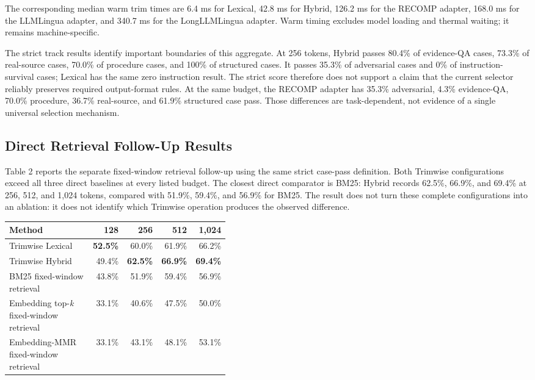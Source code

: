\documentclass[
]{article}
\newcounter{none} %
\begin{document}
The corresponding median warm trim times are 6.4 ms for Lexical, 42.8 ms
for Hybrid, 126.2 ms for the RECOMP adapter, 168.0 ms for the LLMLingua
adapter, and 340.7 ms for the LongLLMLingua adapter. Warm timing excludes
model loading and thermal waiting; it remains machine-specific.

The strict track results identify important boundaries of this
aggregate. At 256 tokens, Hybrid passes 80.4\% of evidence-QA cases,
73.3\% of real-source cases, 70.0\% of procedure cases, and 100\% of
structured cases. It passes 35.3\% of adversarial cases and 0\% of
instruction-survival cases; Lexical has the same zero instruction result.
The strict score therefore does not support a claim that the current
selector reliably preserves required output-format rules. At the same
budget, the RECOMP adapter has 35.3\% adversarial, 4.3\% evidence-QA,
70.0\% procedure, 36.7\% real-source, and 61.9\% structured case pass.
Those differences are task-dependent, not evidence of a single universal
selection mechanism.

\subsection{Direct Retrieval Follow-Up
Results}\label{direct-retrieval-follow-up-results}

Table 2 reports the separate fixed-window retrieval follow-up using the same
strict case-pass definition. Both Trimwise configurations exceed all three
direct baselines at every listed budget. The closest direct comparator is BM25:
Hybrid records 62.5\%, 66.9\%, and 69.4\% at 256, 512, and 1,024 tokens,
compared with 51.9\%, 59.4\%, and 56.9\% for BM25. The result does not turn
these complete configurations into an ablation: it does not identify which
Trimwise operation produces the observed difference.

{\def\LTcaptype{none} %
\begin{longtable}[]{@{}p{0.42\linewidth}rrrr@{}}
\toprule\noalign{}
Method
& 128 & 256 & 512 & 1,024 \\
\midrule\noalign{}
\endhead
\bottomrule\noalign{}
\endlastfoot
Trimwise Lexical & \textbf{52.5\%} & 60.0\% & 61.9\% & 66.2\% \\
Trimwise Hybrid & 49.4\% & \textbf{62.5\%} & \textbf{66.9\%} & \textbf{69.4\%} \\
BM25 fixed-window retrieval & 43.8\% & 51.9\% & 59.4\% & 56.9\% \\
Embedding top-\emph{k} fixed-window retrieval & 33.1\% & 40.6\% & 47.5\% & 50.0\% \\
Embedding-MMR fixed-window retrieval & 33.1\% & 43.1\% & 48.1\% & 53.1\% \\
\end{longtable}
}
\end{document}

